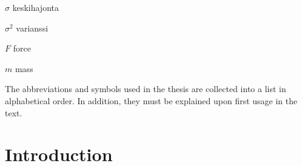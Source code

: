 \documentclass[12pt,a4paper,finnish]{tutthesis}
\begin{document}
\begin{termlist}
\item [$\sigma$] keskihajonta
\item [$\sigma^2$] varianssi
\item [$F$] force
\item [$m$] mass
\end{termlist} 

The abbreviations and symbols used in the thesis are collected into a
list in alphabetical order. In addition, they must be explained upon
first usage in the text.


\cleardoublepage

\newpage             %
\setcounter{page}{1} %
\renewcommand{\chaptername}{} %
\chapter{Introduction}
\label{ch:intro} 


\end{document}
